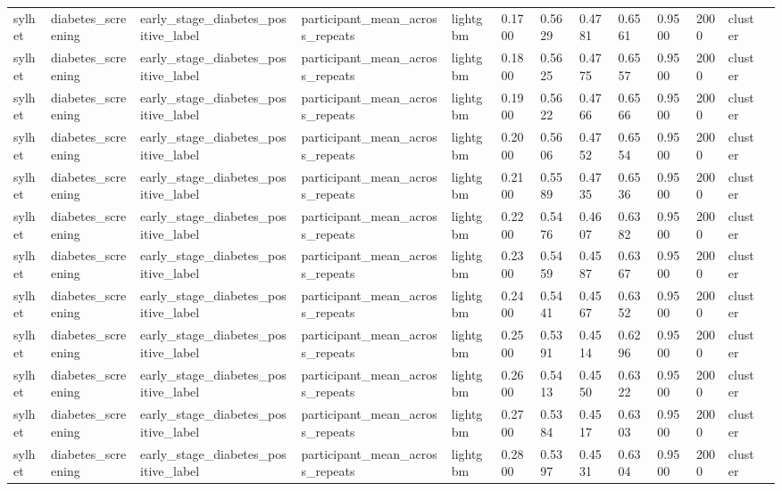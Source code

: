 \begin{tabular}{lllllllllllll}
sylhet & diabetes\_screening & early\_stage\_diabetes\_positive\_label & participant\_mean\_across\_repeats & lightgbm & 0.1700 & 0.5629 & 0.4781 & 0.6561 & 0.9500 & 2000 & cluster &  \\
sylhet & diabetes\_screening & early\_stage\_diabetes\_positive\_label & participant\_mean\_across\_repeats & lightgbm & 0.1800 & 0.5625 & 0.4775 & 0.6557 & 0.9500 & 2000 & cluster &  \\
sylhet & diabetes\_screening & early\_stage\_diabetes\_positive\_label & participant\_mean\_across\_repeats & lightgbm & 0.1900 & 0.5622 & 0.4766 & 0.6566 & 0.9500 & 2000 & cluster &  \\
sylhet & diabetes\_screening & early\_stage\_diabetes\_positive\_label & participant\_mean\_across\_repeats & lightgbm & 0.2000 & 0.5606 & 0.4752 & 0.6554 & 0.9500 & 2000 & cluster &  \\
sylhet & diabetes\_screening & early\_stage\_diabetes\_positive\_label & participant\_mean\_across\_repeats & lightgbm & 0.2100 & 0.5589 & 0.4735 & 0.6536 & 0.9500 & 2000 & cluster &  \\
sylhet & diabetes\_screening & early\_stage\_diabetes\_positive\_label & participant\_mean\_across\_repeats & lightgbm & 0.2200 & 0.5476 & 0.4607 & 0.6382 & 0.9500 & 2000 & cluster &  \\
sylhet & diabetes\_screening & early\_stage\_diabetes\_positive\_label & participant\_mean\_across\_repeats & lightgbm & 0.2300 & 0.5459 & 0.4587 & 0.6367 & 0.9500 & 2000 & cluster &  \\
sylhet & diabetes\_screening & early\_stage\_diabetes\_positive\_label & participant\_mean\_across\_repeats & lightgbm & 0.2400 & 0.5441 & 0.4567 & 0.6352 & 0.9500 & 2000 & cluster &  \\
sylhet & diabetes\_screening & early\_stage\_diabetes\_positive\_label & participant\_mean\_across\_repeats & lightgbm & 0.2500 & 0.5391 & 0.4514 & 0.6296 & 0.9500 & 2000 & cluster &  \\
sylhet & diabetes\_screening & early\_stage\_diabetes\_positive\_label & participant\_mean\_across\_repeats & lightgbm & 0.2600 & 0.5413 & 0.4550 & 0.6322 & 0.9500 & 2000 & cluster &  \\
sylhet & diabetes\_screening & early\_stage\_diabetes\_positive\_label & participant\_mean\_across\_repeats & lightgbm & 0.2700 & 0.5384 & 0.4517 & 0.6303 & 0.9500 & 2000 & cluster &  \\
sylhet & diabetes\_screening & early\_stage\_diabetes\_positive\_label & participant\_mean\_across\_repeats & lightgbm & 0.2800 & 0.5397 & 0.4531 & 0.6304 & 0.9500 & 2000 & cluster &  \\

\end{tabular}
